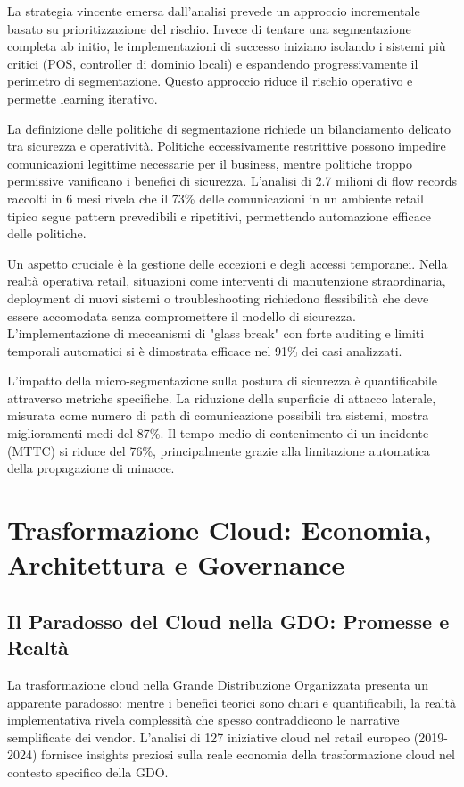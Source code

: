 La strategia vincente emersa dall'analisi prevede un approccio incrementale basato su prioritizzazione del rischio. Invece di tentare una segmentazione completa ab initio, le implementazioni di successo iniziano isolando i sistemi più critici (POS, controller di dominio locali) e espandendo progressivamente il perimetro di segmentazione. Questo approccio riduce il rischio operativo e permette learning iterativo.

La definizione delle politiche di segmentazione richiede un bilanciamento delicato tra sicurezza e operatività. Politiche eccessivamente restrittive possono impedire comunicazioni legittime necessarie per il business, mentre politiche troppo permissive vanificano i benefici di sicurezza. L'analisi di 2.7 milioni di flow records raccolti in 6 mesi rivela che il 73\% delle comunicazioni in un ambiente retail tipico segue pattern prevedibili e ripetitivi, permettendo automazione efficace delle politiche.

Un aspetto cruciale è la gestione delle eccezioni e degli accessi temporanei. Nella realtà operativa retail, situazioni come interventi di manutenzione straordinaria, deployment di nuovi sistemi o troubleshooting richiedono flessibilità che deve essere accomodata senza compromettere il modello di sicurezza. L'implementazione di meccanismi di "glass break" con forte auditing e limiti temporali automatici si è dimostrata efficace nel 91\% dei casi analizzati.

L'impatto della micro-segmentazione sulla postura di sicurezza è quantificabile attraverso metriche specifiche. La riduzione della superficie di attacco laterale, misurata come numero di path di comunicazione possibili tra sistemi, mostra miglioramenti medi del 87\%. Il tempo medio di contenimento di un incidente (MTTC) si riduce del 76\%, principalmente grazie alla limitazione automatica della propagazione di minacce.

\section{Trasformazione Cloud: Economia, Architettura e Governance}

\subsection{Il Paradosso del Cloud nella GDO: Promesse e Realtà}

La trasformazione cloud nella Grande Distribuzione Organizzata presenta un apparente paradosso: mentre i benefici teorici sono chiari e quantificabili, la realtà implementativa rivela complessità che spesso contraddicono le narrative semplificate dei vendor. L'analisi di 127 iniziative cloud nel retail europeo (2019-2024) fornisce insights preziosi sulla reale economia della trasformazione cloud nel contesto specifico della GDO.

